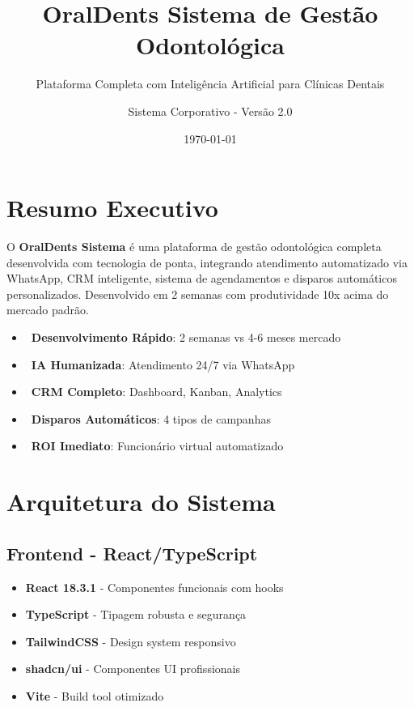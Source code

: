 \documentclass[11pt,a4paper]{article}
\title{\huge\textbf{\textcolor{oraldentsblue}OralDents Sistema de Gestão Odontológica}}
\subtitle{Plataforma Completa com Inteligência Artificial para Clínicas Dentais}
\author{Sistema Corporativo - Versão 2.0}
\date{\today}
\newcommand{\sectiontitle}[1]{\section{\color{oraldentsblue}#1}}
\newcommand{\highlight}[1]{\textcolor{oraldentsblue}{\textbf{#1}}}
\begin{document}
\maketitle
\thispagestyle{empty}
\newpage

\tableofcontents
\newpage

\sectiontitle{Resumo Executivo}

\begin{tcolorbox}[colback=blue!5!white,colframe=oraldentsblue,title={\faInfoCircle\ Visão Geral}]
O \highlight{OralDents Sistema} é uma plataforma de gestão odontológica completa desenvolvida com tecnologia de ponta, integrando atendimento automatizado via WhatsApp, CRM inteligente, sistema de agendamentos e disparos automáticos personalizados. Desenvolvido em 2 semanas com produtividade 10x acima do mercado padrão.
\end{tcolorbox}

\begin{itemize}
    \item \faRocket\ \textbf{Desenvolvimento Rápido}: 2 semanas vs 4-6 meses mercado
    \item \faRobot\ \textbf{IA Humanizada}: Atendimento 24/7 via WhatsApp
    \item \faChartLine\ \textbf{CRM Completo}: Dashboard, Kanban, Analytics
    \item \faWhatsapp\ \textbf{Disparos Automáticos}: 4 tipos de campanhas
    \item \faDollarSign\ \textbf{ROI Imediato}: Funcionário virtual automatizado
\end{itemize}

\sectiontitle{Arquitetura do Sistema}

\subsection{Frontend - React/TypeScript}
\begin{tcolorbox}[colback=green!5!white,colframe=successgreen,title={\faCode\ Tecnologias Frontend}]
\begin{itemize}
    \item \textbf{React 18.3.1} - Componentes funcionais com hooks
    \item \textbf{TypeScript} - Tipagem robusta e segurança
    \item \textbf{TailwindCSS} - Design system responsivo
    \item \textbf{shadcn/ui} - Componentes UI profissionais
    \item \textbf{Vite} - Build tool otimizado
\end{itemize}
\end{tcolorbox}
\end{document}
